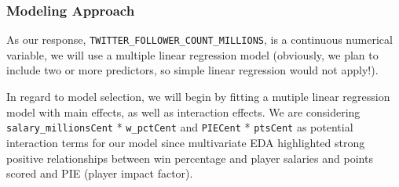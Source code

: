 \documentclass[]{article}
\newenvironment{Shaded}{\begin{snugshade}}{\end{snugshade}}
\newcommand{\DataTypeTok}[1]{\textcolor[rgb]{0.13,0.29,0.53}{#1}}
\newcommand{\KeywordTok}[1]{\textcolor[rgb]{0.13,0.29,0.53}{\textbf{#1}}}
\newcommand{\NormalTok}[1]{#1}
\newcommand{\OperatorTok}[1]{\textcolor[rgb]{0.81,0.36,0.00}{\textbf{#1}}}
\newcommand{\StringTok}[1]{\textcolor[rgb]{0.31,0.60,0.02}{#1}}
\begin{document}
\begin{Shaded}
\end{Shaded}

\hypertarget{modeling-approach}{%
\subsubsection{Modeling Approach}\label{modeling-approach}}

As our response, \texttt{TWITTER\_FOLLOWER\_COUNT\_MILLIONS}, is a
continuous numerical variable, we will use a multiple linear regression
model (obviously, we plan to include two or more predictors, so simple
linear regression would not apply!).

In regard to model selection, we will begin by fitting a mutiple linear
regression model with main effects, as well as interaction effects. We
are considering \texttt{salary\_millionsCent} * \texttt{w\_pctCent} and
\texttt{PIECent} * \texttt{ptsCent} as potential interaction terms for
our model since multivariate EDA highlighted strong positive
relationships between win percentage and player salaries and points
scored and PIE (player impact factor).
\end{document}
